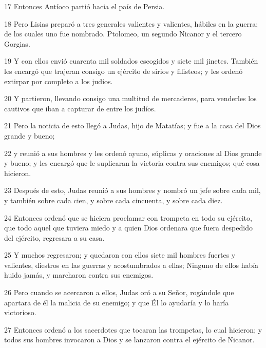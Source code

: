 \par 17 Entonces Antíoco partió hacia el país de Persia.

\par 18 Pero Lisias preparó a tres generales valientes y valientes, hábiles en la guerra; de los cuales uno fue nombrado. Ptolomeo, un segundo Nicanor y el tercero Gorgias.

\par 19 Y con ellos envió cuarenta mil soldados escogidos y siete mil jinetes. También les encargó que trajeran consigo un ejército de sirios y filisteos; y les ordenó extirpar por completo a los judíos.

\par 20 Y partieron, llevando consigo una multitud de mercaderes, para venderles los cautivos que iban a capturar de entre los judíos.

\par 21 Pero la noticia de esto llegó a Judas, hijo de Matatías; y fue a la casa del Dios grande y bueno;

\par 22 y reunió a sus hombres y les ordenó ayuno, súplicas y oraciones al Dios grande y bueno; y les encargó que le suplicaran la victoria contra sus enemigos; qué cosa hicieron.

\par 23 Después de esto, Judas reunió a sus hombres y nombró un jefe sobre cada mil, y también sobre cada cien, y sobre cada cincuenta, y sobre cada diez.

\par 24 Entonces ordenó que se hiciera proclamar con trompeta en todo su ejército, que todo aquel que tuviera miedo y a quien Dios ordenara que fuera despedido del ejército, regresara a su casa.

\par 25 Y muchos regresaron; y quedaron con ellos siete mil hombres fuertes y valientes, diestros en las guerras y acostumbrados a ellas; Ninguno de ellos había huido jamás, y marcharon contra sus enemigos.

\par 26 Pero cuando se acercaron a ellos, Judas oró a su Señor, rogándole que apartara de él la malicia de su enemigo; y que Él lo ayudaría y lo haría victorioso.

\par 27 Entonces ordenó a los sacerdotes que tocaran las trompetas, lo cual hicieron; y todos sus hombres invocaron a Dios y se lanzaron contra el ejército de Nicanor.

